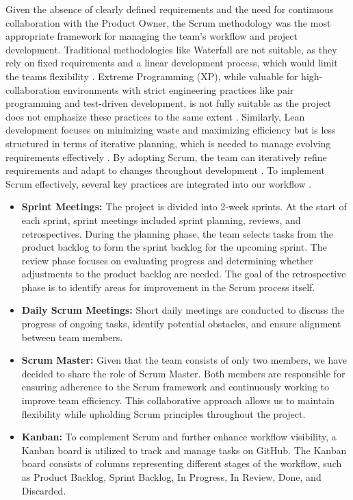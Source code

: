 Given the absence of clearly defined requirements and the need for continuous collaboration with the Product Owner, the Scrum methodology was the most appropriate framework for managing the team's workflow and project development. Traditional methodologies like Waterfall are not suitable, as they rely on fixed requirements and a linear development process, which would limit the teams flexibility \cite{waterfall_model_enwiki:1275499744}. Extreme Programming (XP), while valuable for high-collaboration environments with strict engineering practices like pair programming and test-driven development, is not fully suitable as the project does not emphasize these practices to the same extent \cite{extreme_programming}. Similarly, Lean development focuses on minimizing waste and maximizing efficiency but is less structured in terms of iterative planning, which is needed to manage evolving requirements effectively \cite{lean_programming}. By adopting Scrum, the team can iteratively refine requirements and adapt to changes throughout development \cite{sdlc_model}. To implement Scrum effectively, several key practices are integrated into our workflow \cite{scrum_guide}.

\begin{itemize}
    \item \textbf{Sprint Meetings:} The project is divided into 2-week sprints. At the start of each sprint, sprint meetings included sprint planning, reviews, and retrospectives. During the planning phase, the team selects tasks from the product backlog to form the sprint backlog for the upcoming sprint. The review phase focuses on evaluating progress and determining whether adjustments to the product backlog are needed. The goal of the retrospective phase is to identify areas for improvement in the Scrum process itself.
    \item \textbf{Daily Scrum Meetings:} Short daily meetings are conducted to discuss the progress of ongoing tasks, identify potential obstacles, and ensure alignment between team members. 
    \item \textbf{Scrum Master:} Given that the team consists of only two members, we have decided to share the role of Scrum Master. Both members are responsible for ensuring adherence to the Scrum framework and continuously working to improve team efficiency. This collaborative approach allows us to maintain flexibility while upholding Scrum principles throughout the project.
    \item \textbf{Kanban:} To complement Scrum and further enhance workflow visibility, a Kanban board is utilized to track and manage tasks on GitHub. The Kanban board consists of columns representing different stages of the workflow, such as Product Backlog, Sprint Backlog, In Progress, In Review, Done, and Discarded.
\end{itemize}

